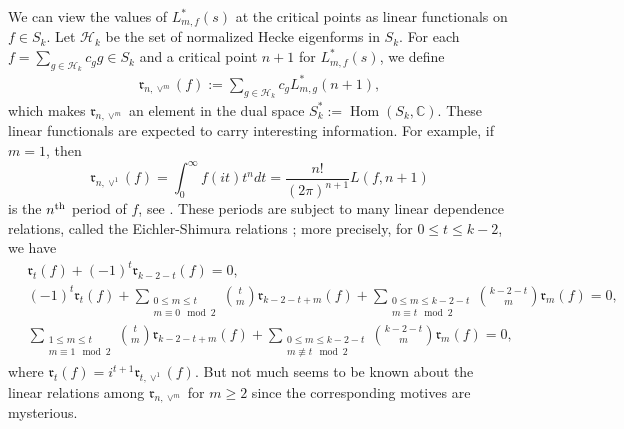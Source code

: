 \documentclass[11pt,letterpaper,reqno]{amsart}
\numberwithin{figure}{section}
\numberwithin{table}{section}
\theoremstyle{definition}
\theoremstyle{plain}
\theoremstyle{definition}
\theoremstyle{definition}
\theoremstyle{remark}
\numberwithin{equation}{section}
\theoremstyle{remark}
\DeclareMathOperator{\Hom}{Hom}
\begin{document}
We can view the values of $L^{\ast}_{m,f}(s)$ at the critical points as linear functionals on $f\in S_k$. Let $\mathcal{H}_k$ be the set of normalized Hecke eigenforms in $S_k$. For each $f=\sum_{g\in\mathcal{H}_k}c_g g\in S_k$ and a critical point $n+1$ for $L^{\ast}_{m,f}(s)$, we define
\begin{align} 
    \mathfrak{r}_{n,\vee^m}(f):=\sum_{g\in\mathcal{H}_k}c_gL^{\ast}_{m,g}(n+1),\label{eq:defofperiods}
\end{align}
which makes $\mathfrak{r}_{n,\vee^m}$ an element in the dual space $S_{k}^{\ast}:=\Hom(S_{k},\mathbb{C})$.
These linear functionals are expected to carry interesting information. For example, if $m=1$, then 
$$\mathfrak{r}_{n,\vee^1}(f)=\int_{0}^{\infty}f(it)t^ndt=\frac{n!}{(2\pi)^{n+1}}L(f,n+1)$$
is the $n^{{\rm th}}$ period of $f$, see \cite{Kohnen1984}. These periods are subject to many linear dependence relations, called the Eichler-Shimura relations \cite{Manin1973}; more precisely, for $0\leq t\leq k-2$, we have
\begin{align}
    \quad \mathfrak{r}_t(f)+(-1)^{t}\mathfrak{r}_{k-2-t}(f)=0,\label{eq:ES1}\tag{ES1}
    \\\quad(-1)^{t}\mathfrak{r}_t(f)+\sum_{\substack{0\leq m\leq t\\m\equiv0\mod2}}\binom{t}{m}\mathfrak{r}_{k-2-t+m}(f)+\sum_{\substack{0\leq m\leq k-2-t\\m\equiv t\mod2}}\binom{k-2-t}{m}\mathfrak{r}_m(f)=0,\label{eq:ES2}\tag{ES2}
    \\\quad\sum_{\substack{1\leq m\leq t\\m\equiv1\mod2}}\binom{t}{m}\mathfrak{r}_{k-2-t+m}(f)+\sum_{\substack{0\leq m\leq k-2-t\\m\not\equiv t\mod2}}\binom{k-2-t}{m}\mathfrak{r}_{m}(f)=0,\label{eq:ES3}\tag{ES3}
    \end{align}
where $\mathfrak{r}_{t}(f)=i^{t+1}\mathfrak{r}_{t,\vee^1}(f)$. But not much seems to be known about the linear relations among $\mathfrak{r}_{n,\vee^m}$ for $m\geq2$ since the corresponding motives are mysterious. 
\end{document}
